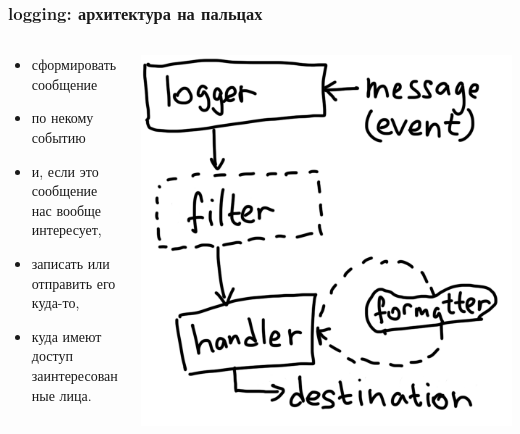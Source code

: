 \documentclass[aspectratio=169]{beamer}
\begin{document}
\begin{frame}
  \frametitle{logging: архитектура на пальцах}

  \begin{columns}

    \begin{column}{.5\textwidth}
      \begin{itemize}
      \item сформировать сообщение
      \item по некому событию
        \vspace{1.5cm}
      \item и, если это сообщение нас вообще интересует,
        \vspace{1cm}
      \item записать или отправить его куда-то,
      \item куда имеют доступ заинтересованные лица.
      \end{itemize}
    \end{column}

    \begin{column}{.5\textwidth}
        \vspace{0.5cm}
      \includegraphics[scale=0.4]{img/logging.png}
    \end{column}

  \end{columns}

\end{frame}
\end{document}
